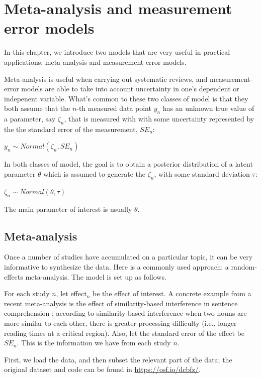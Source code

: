 \documentclass[12pt,]{krantz}
\theoremstyle{definition}
\theoremstyle{definition}
\theoremstyle{definition}
\theoremstyle{remark}
\begin{document}
\hypertarget{ch:remame}{%
\chapter{Meta-analysis and measurement error models}\label{ch:remame}}

In this chapter, we introduce two models that are very useful in practical applications: meta-analysis and measurement-error models.

Meta-analysis is useful when carrying out systematic reviews, and measurement-error models are able to take into account uncertainty in one's dependent or indepenent variable. What's common to these two classes of model is that they both assume that the \(n\)-th measured data point \(y_n\) has an unknown true value of a parameter, say \(\zeta_n\), that is measured with with some uncertainty represented by the the standard error of the measurement, \(SE_n\):

\(y_n \sim Normal(\zeta_n,SE_n)\)

In both classes of model, the goal is to obtain a posterior distribution of a latent parameter \(\theta\) which is assumed to generate the \(\zeta_n\), with some standard deviation \(\tau\):

\(\zeta_n \sim Normal(\theta,\tau)\)

The main parameter of interest is usually \(\theta\).

\hypertarget{meta-analysis}{%
\section{Meta-analysis}\label{meta-analysis}}

Once a number of studies have accumulated on a particular topic, it can be very informative to synthesize the data. Here is a commonly used approach: a random-effects meta-analysis. The model is set up as follows.

For each study \(n\), let effect\(_n\) be the effect of interest. A concrete example from a recent meta-analysis is the effect of similarity-based interference in sentence comprehension \citep{JaegerEtAl2017}; according to similarity-based interference when two nouns are more similar to each other, there is greater processing difficulty (i.e., longer reading times at a critical region). Also, let the standard error of the effect be \(SE_n\). This is the information we have from each study \(n\).

First, we load the data, and then subset the relevant part of the data; the original dataset and code can be found in \url{https://osf.io/dcbfz/}.
\end{document}
